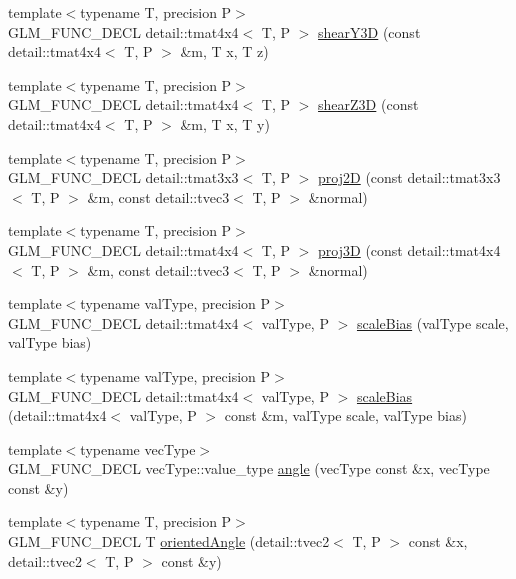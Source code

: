 \begin{CompactItemize}
\item 
{\footnotesize template$<$typename T, precision P$>$ }\\GLM\_\-FUNC\_\-DECL detail::tmat4x4$<$ T, P $>$ \hyperlink{group__gtx__transform2_g9f9bb8a5e641eb978f4ed24e980bd898}{shearY3D} (const detail::tmat4x4$<$ T, P $>$ \&m, T x, T z)
\item 
{\footnotesize template$<$typename T, precision P$>$ }\\GLM\_\-FUNC\_\-DECL detail::tmat4x4$<$ T, P $>$ \hyperlink{group__gtx__transform2_ge94300dc2220af5a0d4afa13c912d1a1}{shearZ3D} (const detail::tmat4x4$<$ T, P $>$ \&m, T x, T y)
\item 
{\footnotesize template$<$typename T, precision P$>$ }\\GLM\_\-FUNC\_\-DECL detail::tmat3x3$<$ T, P $>$ \hyperlink{group__gtx__transform2_gcee3ec4d06d03a1cf9f4037c4effc2e4}{proj2D} (const detail::tmat3x3$<$ T, P $>$ \&m, const detail::tvec3$<$ T, P $>$ \&normal)
\item 
{\footnotesize template$<$typename T, precision P$>$ }\\GLM\_\-FUNC\_\-DECL detail::tmat4x4$<$ T, P $>$ \hyperlink{group__gtx__transform2_gea404ce6c1541825232f418242bff9fb}{proj3D} (const detail::tmat4x4$<$ T, P $>$ \&m, const detail::tvec3$<$ T, P $>$ \&normal)
\item 
{\footnotesize template$<$typename valType, precision P$>$ }\\GLM\_\-FUNC\_\-DECL detail::tmat4x4$<$ valType, P $>$ \hyperlink{group__gtx__transform2_gd75c85daca353804c161589fe32ce107}{scaleBias} (valType scale, valType bias)
\item 
{\footnotesize template$<$typename valType, precision P$>$ }\\GLM\_\-FUNC\_\-DECL detail::tmat4x4$<$ valType, P $>$ \hyperlink{group__gtx__transform2_g235e65153daa1bdc12fcc07c8019931b}{scaleBias} (detail::tmat4x4$<$ valType, P $>$ const \&m, valType scale, valType bias)
\item 
{\footnotesize template$<$typename vecType$>$ }\\GLM\_\-FUNC\_\-DECL vecType::value\_\-type \hyperlink{group__gtx__vector__angle_gb57ebeaf612eb26ab8e47e80b9af2678}{angle} (vecType const \&x, vecType const \&y)
\item 
{\footnotesize template$<$typename T, precision P$>$ }\\GLM\_\-FUNC\_\-DECL T \hyperlink{group__gtx__vector__angle_gfd969749b953f7a58da4a2563d06ea36}{orientedAngle} (detail::tvec2$<$ T, P $>$ const \&x, detail::tvec2$<$ T, P $>$ const \&y)

\end{CompactItemize}

